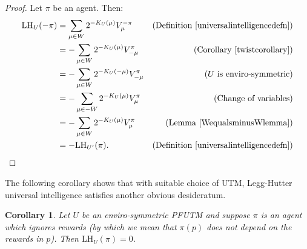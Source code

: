 \documentclass{article}
\newtheorem{corollary}[theorem]{Corollary}
\def\LH{\textrm{LH}}
\def\SYM{S}
\begin{document}
\begin{proof}
    Let $\pi$ be an agent. Then:
    \begin{align*}
        \LH_U(-\pi) &= \sum_{\mu\in W} 2^{-K_U(\mu)}V^{-\pi}_\mu
            &\mbox{(Definition \ref{universalintelligencedefn})}\\
          &= -\sum_{\mu\in W} 2^{-K_U(\mu)}V^\pi_{-\mu}
            &\mbox{(Corollary \ref{twistcorollary})}\\
          &= -\sum_{\mu\in W} 2^{-K_U(-\mu)}V^\pi_{-\mu}
            &\mbox{($U$ is enviro-symmetric)}\\
          &= -\sum_{\mu\in -W} 2^{-K_U(\mu)}V^\pi_\mu
            &\mbox{(Change of variables)}\\
          &= -\sum_{\mu\in W} 2^{-K_U(\mu)}V^\pi_\mu
            &\mbox{(Lemma \ref{WequalsminusWlemma})}\\
          &= -\LH_{U'}(\pi).
            &\mbox{(Definition \ref{universalintelligencedefn})}
    \end{align*}
\end{proof}




The following corollary shows that with suitable choice of UTM,
Legg-Hutter universal intelligence satisfies another obvious desideratum.

\begin{corollary}
\label{ignoringrewardscorollary}
    Let $U$ be an enviro-symmetric PFUTM and
    suppose $\pi$ is an agent which ignores rewards (by which we mean that
    $\pi(p)$ does not depend on the rewards in $p$).
    Then $\LH_U(\pi)=0$.
\end{corollary}
\end{document}
